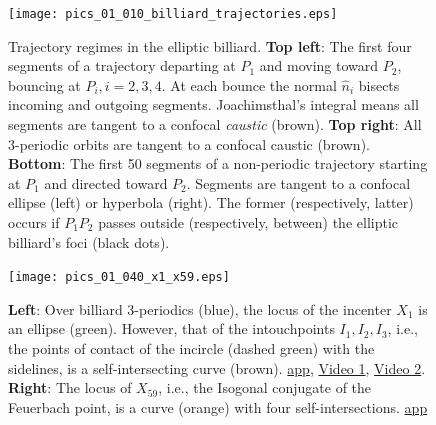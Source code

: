 \begin{figure}
    \centering
    \texttt{[image: pics\_01\_010\_billiard\_trajectories.eps]}
    \caption{Trajectory regimes in the elliptic billiard. \textbf{Top left}: The first four segments of a trajectory departing at $P_1$ and moving toward $P_2$, bouncing at $P_i, i=2,3,4$. At each bounce the normal $\hat{n}_i$ bisects incoming and outgoing segments. Joachimsthal's integral \cite{sergei91} means all segments are tangent to a confocal {\em caustic} (brown). \textbf{Top right}: All 3-periodic orbits are tangent to a confocal caustic (brown). \textbf{Bottom}: The first 50 segments of a non-periodic trajectory starting at $P_1$ and directed toward $P_2$. Segments are tangent to a confocal ellipse (left) or hyperbola (right). The former (respectively, latter) occurs if $P_1P_2$ passes outside (respectively, between) the elliptic billiard's foci (black dots).}
    \label{fig:01-billiard-trajectories}
\end{figure}


\begin{figure}
    \centering
    \texttt{[image: pics\_01\_040\_x1\_x59.eps]}
    \caption{\textbf{Left}: Over billiard 3-periodics (blue), the locus of the incenter $X_1$ is an ellipse (green). However, that of the intouchpoints $I_1,I_2,I_3$, i.e., the points of contact of the incircle (dashed green) with the sidelines, is a self-intersecting curve (brown). \href{https://bit.ly/3q4b0Nn}{app},  \href{https://youtu.be/BBsyM7RnswA}{Video 1}, \href{https://youtu.be/9xU6T7hQMzs}{Video 2}. \textbf{Right}: The locus of $X_{59}$, i.e., the Isogonal conjugate of the Feuerbach point, is a curve (orange) with four self-intersections.
    \href{https://bit.ly/3i4h6dX}{app}}
    \label{fig:01-intouch-x59}
\end{figure}